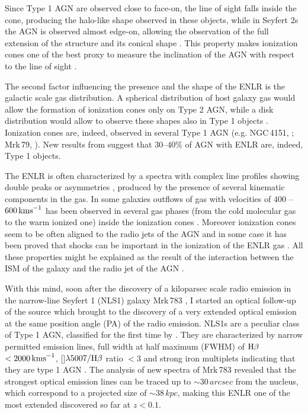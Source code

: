 \documentclass[../thesis.tex]{subfiles}
\begin{document}
Since Type 1 AGN are observed close to face-on, the line of sight falls inside the cone, producing the halo-like shape observed in these objects, while in Seyfert 2s the AGN is observed almost edge-on, allowing the observation of the full extension of the structure and its conical shape \citep{Schmitt03,Schmitt03b}.
This property makes ionization cones one of the best proxy to measure the inclination of the AGN with respect to the line of sight \citep{Fischer13,Marin14}.

The second factor influencing the presence and the shape of the ENLR is the galactic scale gas distribution. 
A spherical distribution of host galaxy gas would allow the formation of ionization cones only on Type 2 AGN, while a disk distribution would allow to observe these shapes also in Type 1 objects \citep{Mulchaey96b,Schmitt03b}.
Ionization cones are, indeed, observed in several Type 1 AGN (e.g. NGC\,4151, \cite{Pogge88}; Mrk\,79, \cite{Schmitt03}).
New results from \citet{He18} suggest that $30$--$40\%$ of AGN with ENLR are, indeed, Type 1 objects. 

The ENLR is often characterized by a spectra with complex line profiles showing double peaks or asymmetries \citep{Dietrich98,Morganti07,Ozaki09,Congiu17b}, produced by the presence of several kinematic components in the gas.
In some galaxies outflows of gas with velocities of $400$ -- $600\,\si{\kms}$ has been observed in several gas phases (from the cold molecular gas to the warm ionized one) inside the ionization cones \citep[e.g. IC\,5063][]{Baldwin87,Morganti98,Morganti07,Dasyra15,Morganti15}.
Moreover ionization cones seem to be often aligned to the radio jets of the AGN \citep{Unger87,Nagar99,Schmitt03,Schmitt03b} and in some case it has been proved that shocks can be important in the ionization of the ENLR gas \citep{Congiu17b,Rodriguez17}.
All these properties might be explained as the result of the interaction between the ISM of the galaxy and the radio jet of the AGN \citep[e.g.][]{Unger87,Tadhunter14,Congiu17b,Rodriguez17}.

With this mind, soon after the discovery of a kiloparsec scale radio emission in the narrow-line Seyfert 1 (NLS1) galaxy Mrk\,783 \citep{Congiu17}, I started an optical follow-up of the source which brought to the discovery of a very extended optical emission at the same position angle (PA) of the radio emission. 
NLS1s are a peculiar class of Type 1 AGN, classified for the first time by \citet{Osterbrock85}.
They are characterized by narrow permitted emission lines, full width at half maximum (FWHM) of $\Hb$ $<2000\,\si{\kms}$, []$\lambda5007/\Hb$ ratio $<3$ \citep{Osterbrock85} and strong iron multiplets indicating that they are type 1 AGN \citep{Goodrich89}.
The analysis of new spectra of Mrk\,783 \citep{Congiu17c} revealed that the strongest optical emission lines can be traced up to $\sim 30\,\si{arcsec}$ from the nucleus, which correspond to a projected size of $\sim 38\,\si{kpc}$, making this ENLR one of the most extended discovered so far at $z<0.1$.
\end{document}
